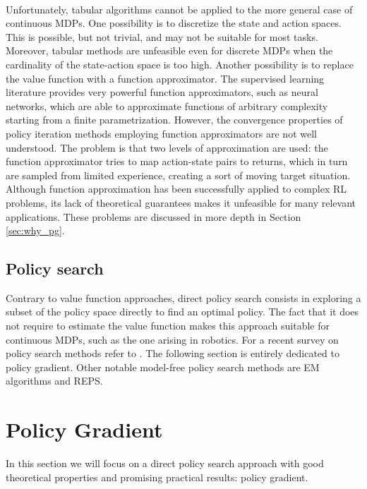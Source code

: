 \paragraph{} %
Unfortunately, tabular algorithms cannot be applied to the more general case of continuous \ac{MDP}s. One possibility is to discretize the state and action spaces. This is possible, but not trivial, and may not be suitable for most tasks. Moreover, tabular methods are unfeasible even for discrete \ac{MDP}s when the cardinality of the state-action space is too high.
Another possibility is to replace the value function with a function approximator. The supervised learning literature provides very powerful function approximators, such as neural networks, which are able to approximate functions of arbitrary complexity starting from a finite parametrization.
However, the convergence properties of policy iteration methods employing function approximators are not well understood. The problem is that two levels of approximation are used: the function approximator tries to map action-state pairs to returns, which in turn are sampled from limited experience, creating a sort of moving target situation. Although function approximation has been successfully applied to complex \ac{RL} problems, its lack of theoretical guarantees makes it unfeasible for many relevant applications. These problems are discussed in more depth in Section \ref{sec:why_pg}.

\subsection{Policy search}
Contrary to value function approaches, direct policy search consists in exploring a subset of the policy space directly to find an optimal policy. The fact that it does not require to estimate the value function makes this approach suitable for continuous \ac{MDP}s, such as the one arising in robotics. For a recent survey on policy search methods refer to \cite{deisenroth2013survey}. The following section is entirely dedicated to policy gradient. Other notable model-free policy search methods are \ac{EM} algorithms and \ac{REPS}.

\section{Policy Gradient}\label{sec:pol_grad}
In this section we will focus on a direct policy search approach with good theoretical properties and promising practical results: policy gradient.

